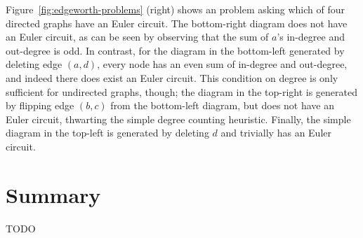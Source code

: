 Figure~\ref{fig:edgeworth-problems} (right) shows an \Edgeworth problem asking which of four directed graphs have an Euler circuit. The bottom-right diagram does not have an Euler circuit, as can be seen by observing that the sum of $a$'s in-degree and out-degree is odd. In contrast, for the diagram in the bottom-left generated by deleting edge $(a, d)$, every node has an even sum of in-degree and out-degree, and indeed there does exist an Euler circuit. This condition on degree is only sufficient for undirected graphs, though; the diagram in the top-right is generated by flipping edge $(b, c)$ from the bottom-left diagram, but does not have an Euler circuit, thwarting the simple degree counting heuristic. Finally, the simple diagram in the top-left is generated by deleting $d$ and trivially has an Euler circuit. 

\section{Summary}

TODO


